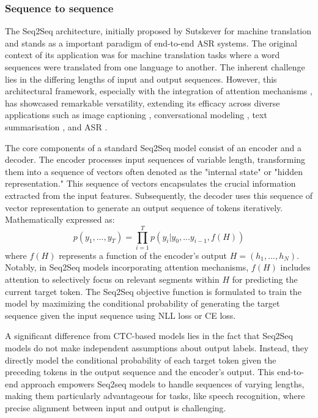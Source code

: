 \subsubsection{Sequence to sequence}
The \ac{Seq2Seq} architecture, initially proposed by Sutskever for machine translation \cite{sutskever2014sequence} and stands as a important paradigm of end-to-end \ac{ASR} systems. The original context of its application was for machine translation tasks where a word sequences were translated from one language to another. The inherent challenge lies in the differing lengths of input and output sequences. However, this architectural framework, especially with the integration of attention mechanisms \cite{bahdanau2014neural}, has showcased remarkable versatility, extending its efficacy across diverse applications such as image captioning \cite{seq2seq_imagecaption}, conversational modeling \cite{vinyals2015neural}, text summarisation \cite{nallapati2016abstractive}, and \ac{ASR} \cite{dong2018speech}.

The core components of a standard \ac{Seq2Seq} model consist of an encoder and a decoder. The encoder processes input sequences of variable length, transforming them into a sequence of vectors often denoted as the "internal state" or "hidden representation." This sequence of vectors encapsulates the crucial information extracted from the input features. Subsequently, the decoder uses this sequence of vector representation to generate an output sequence of tokens iteratively. Mathematically expressed as:
\begin{equation}
    p(y_1,...,y_T) = \prod_{i=1}^{T} p(y_i| y_0,...y_{i-1}, f(H))
\end{equation}
where $f(H)$ represents a function of the encoder's output $H = (h_1, ..., h_N)$. Notably, in \ac{Seq2Seq} models incorporating attention mechanisms, $f(H)$ includes attention to selectively focus on relevant segments within $H$ for predicting the current target token. The \ac{Seq2Seq} objective function is formulated to train the model by maximizing the conditional probability of generating the target sequence given the input sequence using \ac{NLL} loss or \ac{CE} loss.

A significant difference from \ac{CTC}-based models lies in the fact that \ac{Seq2Seq} models do not make independent assumptions about output labels. Instead, they directly model the conditional probability of each target token given the preceding tokens in the output sequence and the encoder's output. This end-to-end approach empowers \ac{Seq2seq} models to handle sequences of varying lengths, making them particularly advantageous for tasks, like speech recognition, where precise alignment between input and output is challenging.


